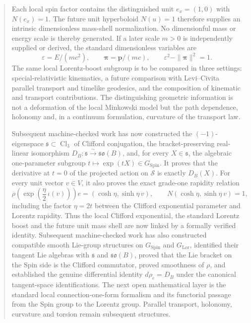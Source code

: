 \documentclass[11pt,a4paper]{article}
\theoremstyle{remark}
\newcommand{\Cl}{\operatorname{Cl}}
\newcommand{\SpinG}{G_{\mathrm{Spin}}}
\newcommand{\LorG}{G_{\mathrm{Lor}}}
\newcommand{\Smodel}{\mathcal S}
\newcommand{\soB}{\mathfrak{so}(B)}
\begin{document}
\begin{abstract}
Each local spin factor contains the distinguished unit \(e_x=(1,0)\) with \(N(e_x)=1\).  The future unit hyperboloid \(N(u)=1\) therefore supplies an intrinsic dimensionless mass-shell normalization.  No dimensionful mass or energy scale is thereby generated.  If a later scale \(m>0\) is independently supplied or derived, the standard dimensionless variables are
\[
  \varepsilon=E/(mc^2),\qquad
  \boldsymbol\pi=\mathbf p/(mc),\qquad
  \varepsilon^2-\|\boldsymbol\pi\|^2=1.
\]
The same local Lorentz-boost subgroup is to be compared in three settings: special-relativistic kinematics, a future comparison with Levi--Civita parallel transport and timelike geodesics, and the composition of kinematic and transport contributions.  The distinguishing geometric information is not a deformation of the local Minkowski model but the path dependence, holonomy and, in a continuum formulation, curvature of the transport law.

Subsequent machine-checked work has now constructed the \((-1)\)-eigenspace \(\mathfrak s\subset\Cl_3\) of Clifford conjugation, the bracket-preserving real-linear isomorphism \(D_B:\mathfrak s\xrightarrow{\sim}\soB\), and, for every \(X\in\mathfrak s\), the algebraic one-parameter subgroup \(t\mapsto\exp(tX)\in\SpinG\).  It proves that the derivative at \(t=0\) of the projected action on \(\Smodel\) is exactly \(D_B(X)\).  For every unit vector \(v\in V\), it also proves the exact grade-one rapidity relation
\[
  \rho\!\left(\exp\!\left(\frac{\eta}{2}\,\iota(v)\right)\right)e
  =(\cosh\eta,\sinh\eta\,v),
  \qquad
  N(\cosh\eta,\sinh\eta\,v)=1,
\]
including the factor \(\eta=2t\) between the Clifford exponential parameter and Lorentz rapidity.  Thus the local Clifford exponential, the standard Lorentz boost and the future unit mass shell are now linked by a formally verified identity.  Subsequent machine-checked work has also constructed compatible smooth Lie-group structures on \(\SpinG\) and \(\LorG\), identified their tangent Lie algebras with \(\mathfrak s\) and \(\soB\), proved that the Lie bracket on the Spin side is the Clifford commutator, proved smoothness of \(\rho\), and established the genuine differential identity \(d\rho_e=D_B\) under the canonical tangent-space identifications.  The next open mathematical layer is the standard local connection-one-form formalism and its functorial passage from the Spin group to the Lorentz group.  Parallel transport, holonomy, curvature and torsion remain subsequent structures.


\end{abstract}
\end{document}
